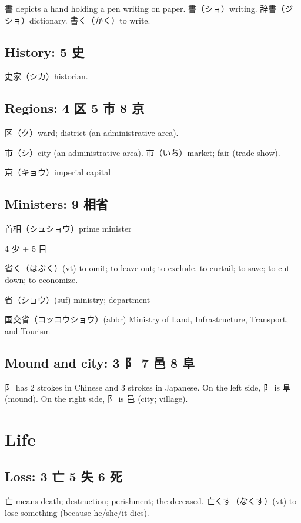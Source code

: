 書 depicts a hand holding a pen writing on paper.
書（ショ）writing.
辞書（ジショ）dictionary.
書く（かく）to write.

\subsection{History: 5 史}

史家（シカ）historian.

\subsection{Regions: 4 区 5 市 8 京}

区（ク）ward; district (an administrative area).

市（シ）city (an administrative area).
市（いち）market; fair (trade show).

京（キョウ）imperial capital

\subsection{Ministers: 9 相省}

首相（シュショウ）prime minister

4 少 + 5 目

省く（はぶく）(vt)
to omit; to leave out; to exclude.
to curtail; to save; to cut down; to economize.

省（ショウ）(suf) ministry; department

国交省（コッコウショウ）(abbr)
Ministry of Land, Infrastructure, Transport, and Tourism

\subsection{Mound and city: 3 阝 7 邑 8 阜}

阝 has 2 strokes in Chinese and 3 strokes in Japanese.
On the left side, 阝 is 阜 (mound).
On the right side, 阝 is 邑 (city; village).

\section{Life}

\subsection{Loss: 3 亡 5 失 6 死}

亡 means death; destruction; perishment; the deceased.
亡くす（なくす）(vt) to lose something (because he/she/it dies).

